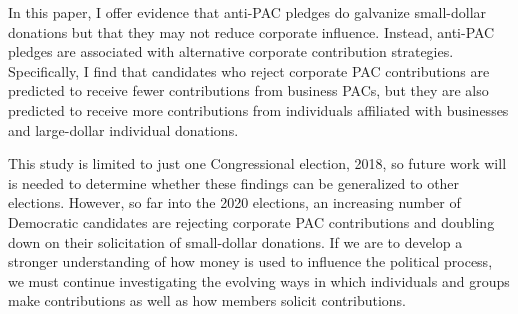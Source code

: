 \documentclass[12pt]{article}
\begin{document}
In this paper, I offer evidence that anti-PAC pledges do galvanize small-dollar donations but that they may not reduce corporate influence. Instead, anti-PAC pledges are associated with alternative corporate contribution strategies. Specifically, I find that candidates who reject corporate PAC contributions are predicted to receive fewer contributions from business PACs, but they are also predicted to receive more contributions from individuals affiliated with businesses and large-dollar individual donations.  

This study is limited to just one Congressional election, 2018, so future work will is needed to determine whether these findings can be generalized to other elections. However, so far into the 2020 elections, an increasing number of Democratic candidates are rejecting corporate PAC contributions and doubling down on their solicitation of small-dollar donations. If we are to develop a stronger understanding of how money is used to influence the political process, we must continue investigating the evolving ways in which individuals and groups make contributions as well as how members solicit contributions. 

\singlespacing
{}
%
\printbibliography
\pagebreak
\end{document}

